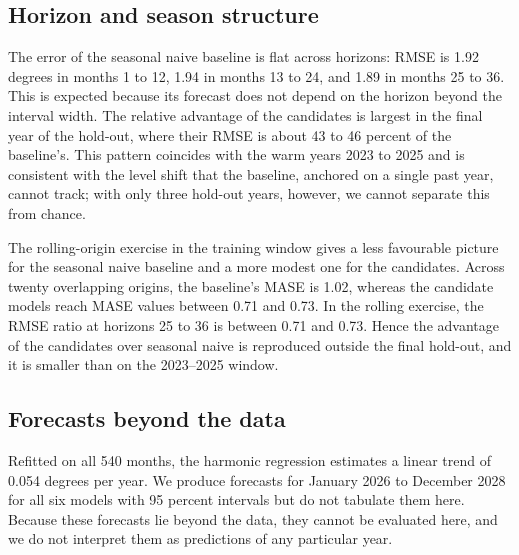 \documentclass[11pt]{article}
\begin{document}
\subsection{Horizon and season structure}

The error of the seasonal naive baseline is flat across horizons: RMSE is 1.92 degrees in months 1 to 12, 1.94 in months 13 to 24, and 1.89 in months 25 to 36.
This is expected because its forecast does not depend on the horizon beyond the interval width. The relative advantage of the candidates is largest in the final year of the hold-out, where their RMSE is about 43 to 46 percent of the baseline's.
This pattern coincides with the warm years 2023 to 2025 and is consistent with the level shift that the baseline, anchored on a single past year, cannot track; with only three hold-out years, however, we cannot separate this from chance.

The rolling-origin exercise in the training window gives a less favourable picture for the seasonal naive baseline and a more modest one for the candidates. Across twenty overlapping origins, the baseline's MASE is 1.02, whereas the candidate models reach MASE values between 0.71 and 0.73.
In the rolling exercise, the RMSE ratio at horizons 25 to 36 is between 0.71 and 0.73.
Hence the advantage of the candidates over seasonal naive is reproduced outside the final hold-out, and it is smaller than on the 2023--2025 window.

\subsection{Forecasts beyond the data}

Refitted on all 540 months, the harmonic regression estimates a linear trend of 0.054 degrees per year.
We produce forecasts for January 2026 to December 2028 for all six models with 95 percent intervals but do not tabulate them here. Because these forecasts lie beyond the data, they cannot be evaluated here, and we do not interpret them as predictions of any particular year.
\end{document}
